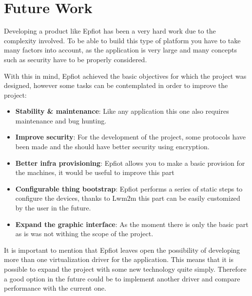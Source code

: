 \newpage
\section{Future Work}
\label{makereference7.2}

Developing a product like Epfiot has been a very hard work due to the complexity involved. To be able to build this type of platform you have to take many factors into account, as the application is very large and many concepts such as security have to be properly considered.

With this in mind, Epfiot achieved the basic objectives for which the project was designed, however some tasks can be contemplated in order to improve the project:

\begin{itemize}
    \item \textbf{Stability \& maintenance}: Like any application this one also requires maintenance and bug hunting.
    \item \textbf{Improve security}: For the development of the project, some protocols have been made and the should have better security using encryption.
    \item \textbf{Better infra provisioning}: Epfiot allows you to make a basic provision for the machines, it would be useful to improve this part
    \item \textbf{Configurable thing bootstrap}: Epfiot performs a series of static steps to configure the devices, thanks to Lwm2m this part can be easily customized by the user in the future.
    \item \textbf{Expand the graphic interface}: As the moment there is only the basic part as is was not withing the scope of the project.
\end{itemize}

It is important to mention that Epfiot leaves open the possibility of developing more than one virtualization driver for the application. This means that it is possible to expand the project with some new technology quite simply. Therefore a good option in the future could be to implement another driver and compare performance with the current one.
